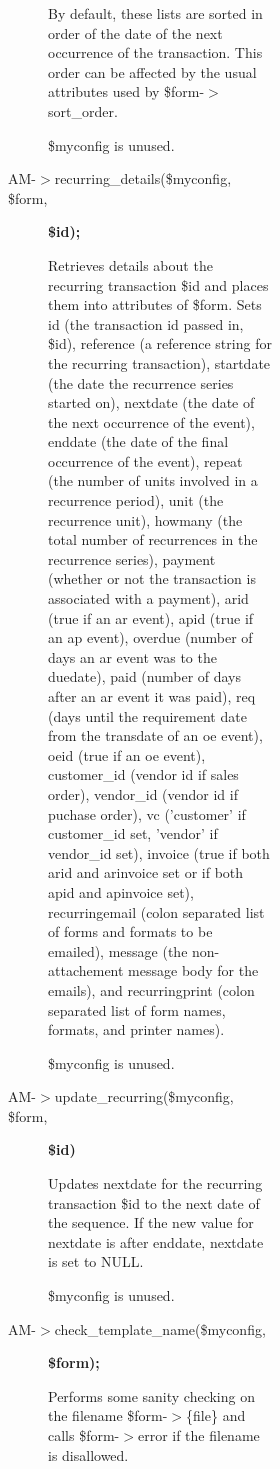 \begin{description}
\begin{description}
\begin{description}
\begin{description}
\begin{description}
\begin{description}
\begin{description}
By default, these lists are sorted in order of the date of the next occurrence
of the transaction.  This order can be affected by the usual attributes used
by \$form-$>$sort\_order.



\$myconfig is unused.


\item[{AM-$>$recurring\_details(\$myconfig, \$form,}] \textbf{\$id);}

Retrieves details about the recurring transaction \$id and places them into
attributes of \$form.  Sets id (the transaction id passed in, \$id), reference 
(a reference string for the recurring transaction), startdate (the date the
recurrence series started on), nextdate (the date of the next occurrence of the
event), enddate (the date of the final occurrence of the event), repeat (the
number of units involved in a recurrence period), unit (the recurrence unit),
howmany (the total number of recurrences in the recurrence series), payment
(whether or not the transaction is associated with a payment), arid (true if an
ar event), apid (true if an ap event), overdue (number of days an ar event was
to the duedate), paid (number of days after an ar event it was paid), req (days
until the requirement date from the transdate of an oe event), oeid (true if an
oe event), customer\_id (vendor id if sales order), vendor\_id (vendor id if
puchase order), vc ('customer' if customer\_id set, 'vendor' if vendor\_id set),
invoice (true if both arid and arinvoice set or if both apid and apinvoice set),
recurringemail (colon separated list of forms and formats to be emailed),
message (the non-attachement message body for the emails), and recurringprint 
(colon separated list of form names, formats, and printer names).



\$myconfig is unused.


\item[{AM-$>$update\_recurring(\$myconfig, \$form,}] \textbf{\$id)}

Updates nextdate for the recurring transaction \$id to the next date of the
sequence.  If the new value for nextdate is after enddate, nextdate is set to
NULL.



\$myconfig is unused.


\item[{AM-$>$check\_template\_name(\$myconfig,}] \textbf{\$form);}

Performs some sanity checking on the filename \$form-$>$\{file\} and calls
\$form-$>$error if the filename is disallowed.



\end{description}
\end{description}
\end{description}
\end{description}
\end{description}
\end{description}
\end{description}
